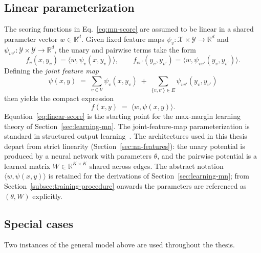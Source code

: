 \subsection{Linear parameterization}
\label{subsec:linear-param}

The scoring functions in Eq.~\eqref{eq:mn-score} are assumed to be
linear in a shared parameter vector $w \in \mathbb{R}^d$. Given fixed
feature maps
$\psi_v\colon \mathcal{X} \times \mathcal{Y} \to \mathbb{R}^d$ and
$\psi_{vv'}\colon \mathcal{Y} \times \mathcal{Y} \to \mathbb{R}^d$, the
unary and pairwise terms take the form
\begin{equation}
    f_v(x, y_v) = \langle w, \psi_v(x, y_v) \rangle,
    \qquad
    f_{vv'}(y_v, y_{v'}) = \langle w, \psi_{vv'}(y_v, y_{v'}) \rangle.
\end{equation}
Defining the \emph{joint feature map}
\begin{equation}
    \psi(x, y) \;=\; \sum_{v \in V} \psi_v(x, y_v)
    \;+\; \sum_{\{v, v'\} \in E} \psi_{vv'}(y_v, y_{v'})
    \label{eq:joint-feature}
\end{equation}
then yields the compact expression
\begin{equation}
    f(x, y) \;=\; \langle w, \psi(x, y) \rangle.
    \label{eq:linear-score}
\end{equation}
Equation~\eqref{eq:linear-score} is the starting point for the
max-margin learning theory of Section~\ref{sec:learning-mn}. The
joint-feature-map parameterization is standard in structured output
learning~\cite{Taskar2004, Tsochantaridis2005}. The architectures
used in this thesis depart from strict linearity
(Section~\ref{sec:nn-features}): the unary potential is produced by
a neural network with parameters $\theta$, and the pairwise
potential is a learned matrix $W \in \mathbb{R}^{K \times K}$ shared
across edges. The abstract notation $\langle w, \psi(x, y)\rangle$
is retained for the derivations of Section~\ref{sec:learning-mn};
from Section~\ref{subsec:training-procedure} onwards the parameters
are referenced as $(\theta, W)$ explicitly.

\subsection{Special cases}

Two instances of the general model above are used throughout the
thesis.

